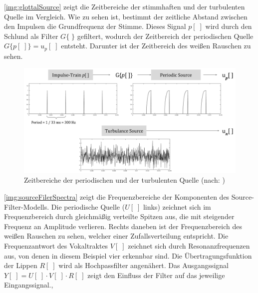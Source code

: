 \autoref{img:glottalSource} zeigt die Zeitbereiche der stimmhaften und der turbulenten Quelle im Vergleich. Wie zu sehen ist, bestimmt der zeitliche Abstand zwischen den Impulsen die Grundfrequenz der Stimme. Dieses Signal $p[\;]$ wird durch den Schlund als Filter $G\{ \; \}$ gefiltert, wodurch der Zeitbereich der periodischen Quelle $G\{p[\;]\} = u_p[\;]$ entsteht. Darunter ist der Zeitbereich des weißen Rauschen zu sehen.\cite[\emph{Source}]{speechAcoustics}

\begin{figure}[h]
	\centering
	\includegraphics[width=1\textwidth]{bilder/glottalSource.png}
	\caption[Zeitbereiche der periodischen und der turbulenten Quelle]{Zeitbereiche der periodischen und der turbulenten Quelle (nach: \cite[Source]{speechAcoustics})}
	\label{img:glottalSource}
\end{figure}	

\autoref{img:sourceFilerSpectra} zeigt die Frequenzbereiche der Komponenten des Source-Filter-Modells. Die periodische Quelle ($U[\;]$ links) zeichnet sich im Frequenzbereich durch gleichmäßig verteilte Spitzen aus, die mit steigender Frequenz an Amplitude verlieren. Rechts daneben ist der Frequenzbereich des weißen Rauschen zu sehen, welcher einer Zufallsverteilung entspricht. Die Frequenzantwort des Vokaltraktes $V[\;]$ zeichnet sich durch Resonanzfrequenzen aus, von denen in diesem Beispiel vier  erkennbar sind. Die Übertragungsfunktion der Lippen $R[\;]$ wird als Hochpassfilter angenähert. Das Ausgangssignal $Y[\;] = U[\;] \cdot V[\;] \cdot R[\;]$ zeigt den Einfluss der Filter auf das jeweilige Eingangssignal.\cite[\emph{Source estimation}]{ricardo_ceps}, \cite[\emph{Vocal Tract Resonance}]{speechAcoustics}

